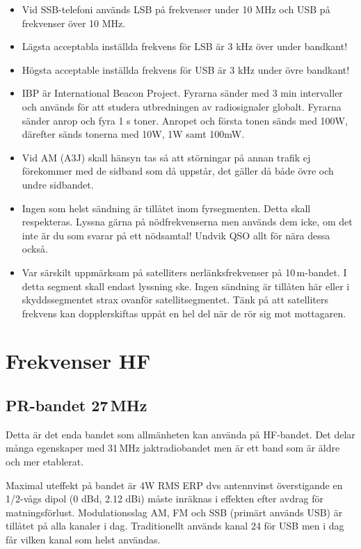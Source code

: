 \begin{itemize}
\item Vid SSB-telefoni används LSB på frekvenser under 10 MHz och USB
      på frekvenser över 10 MHz.
\item Lägsta acceptabla inställda frekvens för LSB är 3 kHz över
      under bandkant!
\item Högsta acceptable inställda frekvens för USB är 3 kHz under
      övre bandkant!
\item IBP är International Beacon Project. Fyrarna sänder med 3 min
      intervaller och används för att studera utbredningen av
      radiosignaler globalt. Fyrarna sänder anrop och fyra 1 s toner.
      Anropet och första tonen sänds med 100W, därefter sänds tonerna
      med 10W, 1W samt 100mW.
\item Vid AM (A3J) skall hänsyn tas så att störningar på annan trafik ej fö\-re\-kom\-mer
      med de sidband som då uppstår, det gäller då både övre och undre
      sidbandet.
\item Ingen som helst sändning är tillåtet inom fyrsegmenten. Detta skall respekteras.
      Lyssna gärna på nödfrekvenserna men används dem icke, om det
      inte är du som svarar på ett nödsamtal! Undvik QSO allt för nära
      dessa också.
\item Var särskilt uppmärksam på satelliters nerlänksfrekvenser på 10\,m-bandet.
      I detta segment skall endast lyssning ske. Ingen sändning är
      tillåten här eller i skyddssegmentet strax ovanför
      satellitsegmentet. Tänk på att satelliters frekvens kan
      dopplerskiftas uppåt en hel del när de rör sig mot mottagaren.
\end{itemize}

\section{Frekvenser HF}

\subsection{PR-bandet 27\,MHz}

Detta är det enda bandet som allmänheten kan använda på HF-bandet. Det delar
många egenskaper med 31\,MHz jaktradiobandet men är ett band som är äldre och
mer etablerat.

Maximal uteffekt på bandet är 4W RMS ERP dvs antennvinst överstigande en
1/2-vågs dipol (0 dBd, 2.12 dBi) måste inräknas i effekten efter avdrag för
matningsförlust. Modulationsslag AM, FM och SSB (primärt används USB) är
tillåtet på alla kanaler i dag. Traditionellt används kanal 24 för USB men i dag
får vilken kanal som helst användas.

